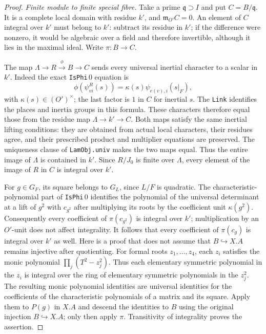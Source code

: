 \begin{proof}
\emph{Finite module to finite special fibre.}
Take a prime $\mathfrak q\supset I$ and put
$C=B/\mathfrak q$.  It is a complete local domain with
residue $k'$, and $\mathfrak m_{O'}C=0$.
An element of $C$ integral over $k'$ must belong to
$k'$: subtract its residue in $k'$; if the difference
were nonzero, it would be algebraic over a field and
therefore invertible, although it lies in the maximal
ideal.  Write $\pi:B\to C$.

The map $\Lambda\to R\xrightarrow{\phi}B\to C$
sends every universal inertial character to a scalar
in $k'$.  Indeed the exact \texttt{IsPhi}$\,0$
equation is
\[
 \phi(\psi^R_{vi}(s))
        =\kappa(s)\psi_{e(v),i}(s|_F),
 \tag{IX.28}
\]
with $\kappa(s)\in(O')^\times$; the last factor is $1$
in $C$ for inertial $s$.  The \texttt{Link} identifies
the places and inertia groups in this formula.
These characters therefore equal those from the
residue map $\Lambda\to k'\to C$.
Both maps satisfy the same inertial lifting conditions:
they are obtained from actual local characters, their
residues agree, and their prescribed product and
multiplier equations are preserved.
The uniqueness clause of \texttt{LamObj.univ} makes
the two maps equal.  Thus the entire image of
$\Lambda$ is contained in $k'$.
Since $R/J_0$ is finite over $\Lambda$, every element
of the image of $R$ in $C$ is integral over $k'$.

For $g\in G_F$, its square belongs to $G_L$, since
$L/F$ is quadratic.  The characteristic-polynomial
part of \texttt{IsPhi}$\,0$ identifies the polynomial
of the universal determinant at a lift of $g^2$ with
$c_{g^2}$ after multiplying its roots by the coefficient
unit $\kappa(g^2)$.  Consequently every coefficient
of $\pi(c_{g^2})$ is integral over $k'$; multiplication
by an $O'$-unit does not affect integrality.
It follows that every coefficient of $\pi(c_g)$
is integral over $k'$ as well.  Here is a proof that
does not assume that $B\hookrightarrow X.A$ remains
injective after quotienting.  For formal roots
$z_1,\ldots,z_4$, each $z_i$ satisfies the monic
polynomial $\prod_j(T^2-z_j^2)$.  Thus each elementary
symmetric polynomial in the $z_i$ is integral over
the ring of elementary symmetric polynomials in the
$z_j^2$.  The resulting monic polynomial identities
are universal identities for the coefficients of
the characteristic polynomials of a matrix and its
square.  Apply them to $P(g)$ in $X.A$ and descend
the identities to $B$ using the original injection
$B\hookrightarrow X.A$; only then apply $\pi$.
Transitivity of integrality proves the assertion.


\end{proof}
